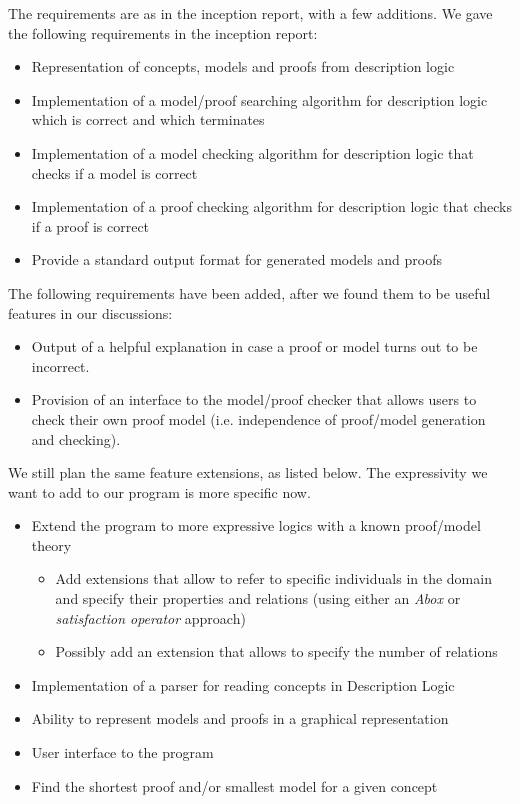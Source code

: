 The requirements are as in the inception report, with a few additions. We gave the following requirements in the inception report:
\begin{itemize}
\item Representation of concepts, models and proofs from description logic
\item Implementation of a model/proof searching algorithm for description logic which is correct and which terminates
\item Implementation of a model checking algorithm for description logic that checks
if a model is correct
\item Implementation of a proof checking algorithm for description logic that checks if a proof is correct
\item Provide a standard output format for generated models and proofs 
\end{itemize}
The following requirements have been added, after we found them to be useful features
in our discussions:
\begin{itemize}
\item Output of a helpful explanation in case a proof or model turns out to be incorrect.
\item Provision of an interface to the model/proof checker that allows users to check their own proof model (i.e. independence of proof/model generation and checking).
\end{itemize}

We still plan the same feature extensions, as listed below. The expressivity we want to
add to our program is more specific now.

\begin{itemize}
\item Extend the program to more expressive logics with a known proof/model theory
  \begin{itemize}
    \item Add extensions that allow to refer to specific individuals in the domain and
      specify their properties and relations (using either an \emph{Abox} or \emph{satisfaction operator} approach)
    \item Possibly add an extension that allows to specify the number of relations
  \end{itemize}
\item Implementation of a parser for reading concepts in Description Logic
\item Ability to represent models and proofs in a graphical representation
\item User interface to the program
\item Find the shortest proof and/or smallest model for a given concept
\end{itemize}

